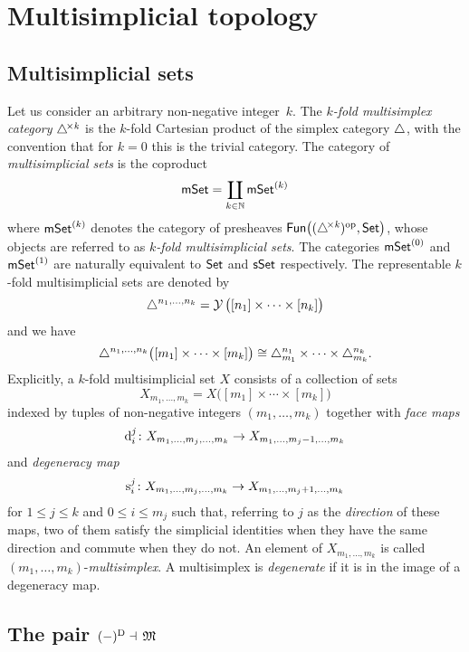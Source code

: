 
\section{Multisimplicial topology}


\subsection{Multisimplicial sets}

Let us consider an arbitrary non-negative integer~$k$.
The \textit{$k$-fold multisimplex category} $\triangle^{\!\times\mathit{k}}$ is the $k$-fold Cartesian product of the simplex category $\triangle$, with the convention that for $k = 0$ this is the trivial category.
The category of \textit{multisimplicial sets} is the coproduct
\[
\mathsf{mSet} = \coprod_{k \in \mathbb{N}} \mathsf{mSet}^{(k)}
\]
where $\mathsf{mSet}^{(k)}$ denotes the category of presheaves $\mathsf{Fun} \big( (\triangle^{\!\times\mathit{k}})^{\mathrm{op}}, \mathsf{Set} \big)$, whose objects are referred to as \textit{$k$-fold multisimplicial sets}.
The categories $\mathsf{mSet}^{(0)}$ and $\mathsf{mSet}^{(1)}$ are naturally equivalent to $\mathsf{Set}$ and $\mathsf{sSet}$ respectively.
The representable $k$-fold multisimplicial sets are denoted by
\[
\triangle^{n_1, \dots, n_k} =
\operatorname{\mathcal{Y}} \big( [n_1] \times \cdots \times [n_k] \big)
\]
and we have
\[
\triangle^{n_1, \dots, n_k} \big( [m_1] \times \cdots \times [m_k] \big) \cong
\triangle^{n_1}_{m_1} \times \dots \times \triangle^{n_k}_{m_k}.
\]
Explicitly, a $k$-fold multisimplicial set $X$ consists of a collection of sets
\[
X_{m_1, \dots, m_k} =
X \big( [m_1] \times \cdots \times [m_k] \big)
\]
indexed by tuples of non-negative integers $(m_1, \dots, m_k)$ together with \textit{face maps}
\[
\operatorname{d}_i^j \colon
X_{m_1, \dots, m_j, \dots, m_k} \to
X_{m_1, \dots, m_j-1, \dots, m_k}
\]
and \textit{degeneracy map}
\[
\operatorname{s}^j_i \colon X_{m_1, \dots, m_j, \dots, m_k} \to X_{m_1, \dots, m_j+1, \dots, m_k}
\]
for $1 \leq j \leq k$ and $0 \leq i \leq m_j$ such that, referring to $j$ as the \textit{direction} of these maps, two of them satisfy the simplicial identities when they have the same direction and commute when they do not.
An element of $X_{m_1, \dots, m_k}$ is called
$(m_1, \dots, m_k)$-\textit{multisimplex}.
A multisimplex is \textit{degenerate} if it is in the image of a degeneracy map.

\subsection{The pair $(-)^{\mathrm{D}} \dashv \, \operatorname{\mathfrak{M}}$} \label{ss:diagonal simplicial set}

